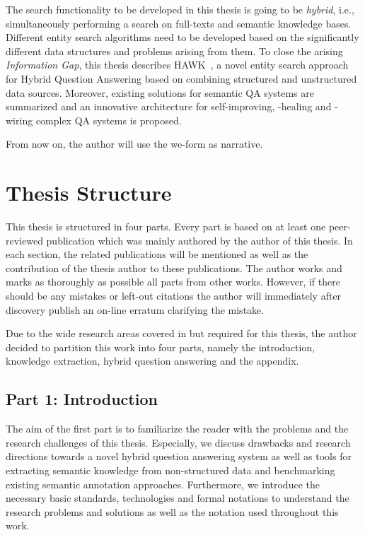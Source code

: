\begin{enumerate}
The search functionality to be developed in this thesis is going to be \emph{hybrid}, i.e., simultaneously performing a search on full-texts and semantic knowledge bases.
Different entity search algorithms need to be developed based on the significantly different data structures and problems arising from them. 
To close the arising \emph{Information Gap}, this thesis describes HAWK~\cite{hawk_2015}, a novel entity search approach for Hybrid Question Answering based on combining structured and unstructured data sources.
Moreover, existing solutions for semantic QA systems are summarized and an innovative architecture for self-improving, -healing and -wiring complex QA systems is proposed.
\end{enumerate}
From now on, the author will use the we-form as narrative.


\section{Thesis Structure}

This thesis is structured in four parts.
Every part is based on at least one peer-reviewed publication which was mainly authored by the author of this thesis.
In each section, the related publications will be mentioned as well as the contribution of the thesis author to these publications. 
The author works and marks as thoroughly as possible all parts from other works. 
However, if there should be any mistakes or left-out citations the author will immediately after discovery publish an on-line erratum clarifying the mistake. 

Due to the wide research areas covered in but required for this thesis, the author decided to partition this work into four parts, namely the introduction, knowledge extraction, hybrid question answering and the appendix. 

\subsection{Part 1: Introduction}
The aim of the first part is to familiarize the reader with the problems and the research challenges of this thesis. 
Especially, we discuss drawbacks and research directions towards a novel hybrid question answering system as well as tools for extracting semantic knowledge from non-structured data and benchmarking existing semantic annotation approaches.
Furthermore, we introduce the necessary basic standards, technologies and formal notations to understand the research problems and solutions as well as the notation used throughout this work.

